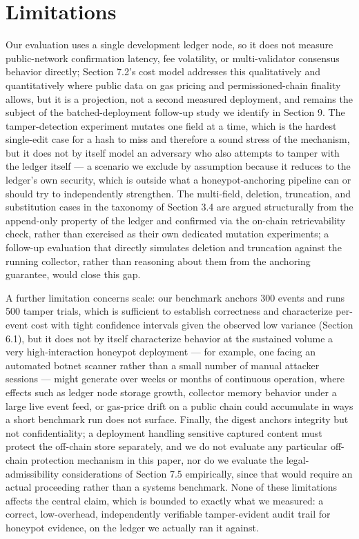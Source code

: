 \documentclass[journal]{IEEEtran}
\begin{document}
\section{Limitations}

Our evaluation uses a single development ledger node, so it does not measure public-network confirmation latency, fee volatility, or multi-validator consensus behavior directly; Section 7.2's cost model addresses this qualitatively and quantitatively where public data on gas pricing and permissioned-chain finality allows, but it is a projection, not a second measured deployment, and remains the subject of the batched-deployment follow-up study we identify in Section 9. The tamper-detection experiment mutates one field at a time, which is the hardest single-edit case for a hash to miss and therefore a sound stress of the mechanism, but it does not by itself model an adversary who also attempts to tamper with the ledger itself --- a scenario we exclude by assumption because it reduces to the ledger's own security, which is outside what a honeypot-anchoring pipeline can or should try to independently strengthen. The multi-field, deletion, truncation, and substitution cases in the taxonomy of Section 3.4 are argued structurally from the append-only property of the ledger and confirmed via the on-chain retrievability check, rather than exercised as their own dedicated mutation experiments; a follow-up evaluation that directly simulates deletion and truncation against the running collector, rather than reasoning about them from the anchoring guarantee, would close this gap.

A further limitation concerns scale: our benchmark anchors 300 events and runs 500 tamper trials, which is sufficient to establish correctness and characterize per-event cost with tight confidence intervals given the observed low variance (Section 6.1), but it does not by itself characterize behavior at the sustained volume a very high-interaction honeypot deployment --- for example, one facing an automated botnet scanner rather than a small number of manual attacker sessions --- might generate over weeks or months of continuous operation, where effects such as ledger node storage growth, collector memory behavior under a large live event feed, or gas-price drift on a public chain could accumulate in ways a short benchmark run does not surface. Finally, the digest anchors integrity but not confidentiality; a deployment handling sensitive captured content must protect the off-chain store separately, and we do not evaluate any particular off-chain protection mechanism in this paper, nor do we evaluate the legal-admissibility considerations of Section 7.5 empirically, since that would require an actual proceeding rather than a systems benchmark. None of these limitations affects the central claim, which is bounded to exactly what we measured: a correct, low-overhead, independently verifiable tamper-evident audit trail for honeypot evidence, on the ledger we actually ran it against.
\end{document}

